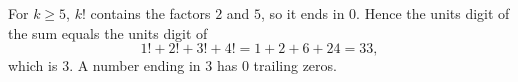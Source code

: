 For $k\ge5$, $k!$ contains the factors $2$ and $5$, so it ends in $0$. Hence the units digit of the sum equals the units digit of
\[
1!+2!+3!+4!=1+2+6+24=33,
\]
which is $3$. A number ending in $3$ has $\boxed{0}$ trailing zeros.
